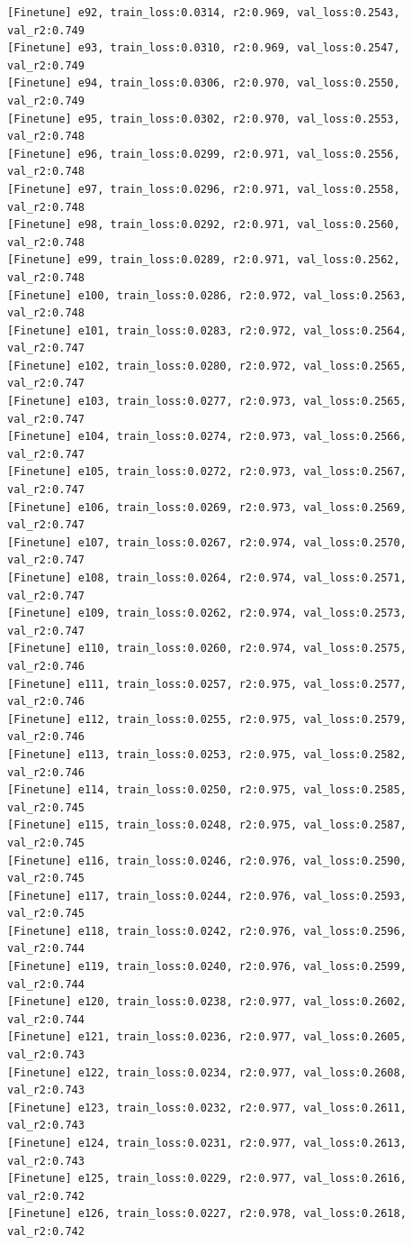 \documentclass[a4paper, 12pt]{article}
\begin{document}
\begin{lstlisting}
[Finetune] e92, train_loss:0.0314, r2:0.969, val_loss:0.2543, val_r2:0.749
[Finetune] e93, train_loss:0.0310, r2:0.969, val_loss:0.2547, val_r2:0.749
[Finetune] e94, train_loss:0.0306, r2:0.970, val_loss:0.2550, val_r2:0.749
[Finetune] e95, train_loss:0.0302, r2:0.970, val_loss:0.2553, val_r2:0.748
[Finetune] e96, train_loss:0.0299, r2:0.971, val_loss:0.2556, val_r2:0.748
[Finetune] e97, train_loss:0.0296, r2:0.971, val_loss:0.2558, val_r2:0.748
[Finetune] e98, train_loss:0.0292, r2:0.971, val_loss:0.2560, val_r2:0.748
[Finetune] e99, train_loss:0.0289, r2:0.971, val_loss:0.2562, val_r2:0.748
[Finetune] e100, train_loss:0.0286, r2:0.972, val_loss:0.2563, val_r2:0.748
[Finetune] e101, train_loss:0.0283, r2:0.972, val_loss:0.2564, val_r2:0.747
[Finetune] e102, train_loss:0.0280, r2:0.972, val_loss:0.2565, val_r2:0.747
[Finetune] e103, train_loss:0.0277, r2:0.973, val_loss:0.2565, val_r2:0.747
[Finetune] e104, train_loss:0.0274, r2:0.973, val_loss:0.2566, val_r2:0.747
[Finetune] e105, train_loss:0.0272, r2:0.973, val_loss:0.2567, val_r2:0.747
[Finetune] e106, train_loss:0.0269, r2:0.973, val_loss:0.2569, val_r2:0.747
[Finetune] e107, train_loss:0.0267, r2:0.974, val_loss:0.2570, val_r2:0.747
[Finetune] e108, train_loss:0.0264, r2:0.974, val_loss:0.2571, val_r2:0.747
[Finetune] e109, train_loss:0.0262, r2:0.974, val_loss:0.2573, val_r2:0.747
[Finetune] e110, train_loss:0.0260, r2:0.974, val_loss:0.2575, val_r2:0.746
[Finetune] e111, train_loss:0.0257, r2:0.975, val_loss:0.2577, val_r2:0.746
[Finetune] e112, train_loss:0.0255, r2:0.975, val_loss:0.2579, val_r2:0.746
[Finetune] e113, train_loss:0.0253, r2:0.975, val_loss:0.2582, val_r2:0.746
[Finetune] e114, train_loss:0.0250, r2:0.975, val_loss:0.2585, val_r2:0.745
[Finetune] e115, train_loss:0.0248, r2:0.975, val_loss:0.2587, val_r2:0.745
[Finetune] e116, train_loss:0.0246, r2:0.976, val_loss:0.2590, val_r2:0.745
[Finetune] e117, train_loss:0.0244, r2:0.976, val_loss:0.2593, val_r2:0.745
[Finetune] e118, train_loss:0.0242, r2:0.976, val_loss:0.2596, val_r2:0.744
[Finetune] e119, train_loss:0.0240, r2:0.976, val_loss:0.2599, val_r2:0.744
[Finetune] e120, train_loss:0.0238, r2:0.977, val_loss:0.2602, val_r2:0.744
[Finetune] e121, train_loss:0.0236, r2:0.977, val_loss:0.2605, val_r2:0.743
[Finetune] e122, train_loss:0.0234, r2:0.977, val_loss:0.2608, val_r2:0.743
[Finetune] e123, train_loss:0.0232, r2:0.977, val_loss:0.2611, val_r2:0.743
[Finetune] e124, train_loss:0.0231, r2:0.977, val_loss:0.2613, val_r2:0.743
[Finetune] e125, train_loss:0.0229, r2:0.977, val_loss:0.2616, val_r2:0.742
[Finetune] e126, train_loss:0.0227, r2:0.978, val_loss:0.2618, val_r2:0.742

\end{lstlisting}
\end{document}
